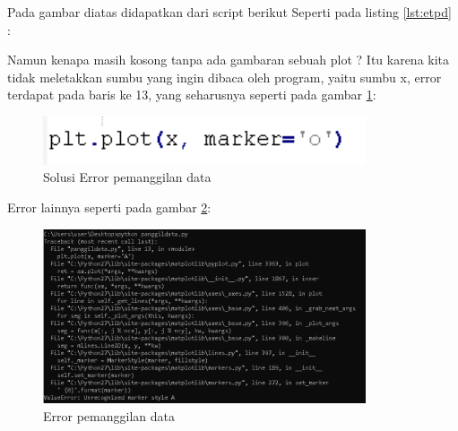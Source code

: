 Pada gambar diatas didapatkan dari script berikut Seperti pada listing \ref{lst:etpd} : 


Namun kenapa masih kosong tanpa ada gambaran sebuah plot ? Itu karena kita tidak meletakkan sumbu yang ingin dibaca oleh program, yaitu sumbu x, error terdapat pada baris ke 13, yang seharusnya seperti pada gambar \ref{fig:solerrpd}:
\begin{figure}[!htbp]
	\centerline{\includegraphics[width=0.85\textwidth]{figures/6/solerrpd.PNG}}
	\caption{Solusi Error pemanggilan data}
	\label{fig:solerrpd}
\end{figure} 

Error lainnya seperti pada gambar \ref{fig:errpdl}:
\begin{figure}[!htbp]
	\centerline{\includegraphics[width=0.85\textwidth]{figures/6/errpdl.PNG}}
	\caption{Error pemanggilan data}
	\label{fig:errpdl}
\end{figure} 

